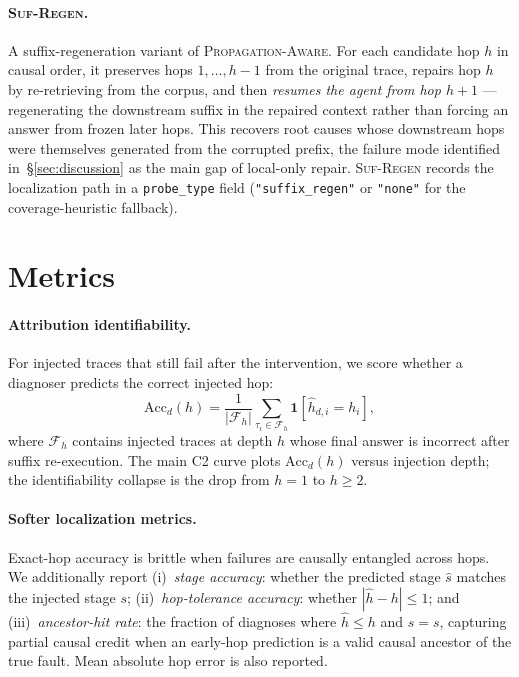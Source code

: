\documentclass[11pt]{article}
\newcommand{\pa}{\textnormal{\textsc{Propagation-Aware}}}
\newcommand{\sr}{\textnormal{\textsc{Suf-Regen}}}
\begin{document}
\paragraph{\sr.}
A suffix-regeneration variant of \pa.  For each candidate hop $h$ in causal
order, it preserves hops $1{,}\ldots,h{-}1$ from the original trace, repairs hop
$h$ by re-retrieving from the corpus, and then \emph{resumes the agent from hop
$h{+}1$} --- regenerating the downstream suffix in the repaired context rather than
forcing an answer from frozen later hops.  This recovers root causes whose
downstream hops were themselves generated from the corrupted prefix, the failure
mode identified in~\S\ref{sec:discussion} as the main gap of local-only repair.
\sr{} records the localization path in a \texttt{probe\_type} field
(\texttt{"suffix\_regen"} or \texttt{"none"} for the coverage-heuristic
fallback).

\section{Metrics}
\label{sec:metrics}

\paragraph{Attribution identifiability.}
For injected traces that still fail after the intervention, we score whether a
diagnoser predicts the correct injected hop:
\[
  \mathrm{Acc}_d(h) =
  \frac{1}{|\mathcal{F}_h|}
  \sum_{\tau_i \in \mathcal{F}_h}
  \mathbf{1}[\hat{h}_{d,i} = h_i],
\]
where $\mathcal{F}_h$ contains injected traces at depth $h$ whose final answer
is incorrect after suffix re-execution.  The main C2 curve plots
$\mathrm{Acc}_d(h)$ versus injection depth; the identifiability collapse is the
drop from $h{=}1$ to $h{\geq}2$.

\paragraph{Softer localization metrics.}
Exact-hop accuracy is brittle when failures are causally entangled across hops.
We additionally report (i)~\emph{stage accuracy}: whether the predicted stage
$\hat{s}$ matches the injected stage $s$; (ii)~\emph{hop-tolerance accuracy}:
whether $|\hat{h} - h| \leq 1$; and (iii)~\emph{ancestor-hit rate}: the
fraction of diagnoses where $\hat{h} \leq h$ and $\hat{s} = s$, capturing
partial causal credit when an early-hop prediction is a valid causal ancestor of
the true fault.  Mean absolute hop error is also reported.
\end{document}

